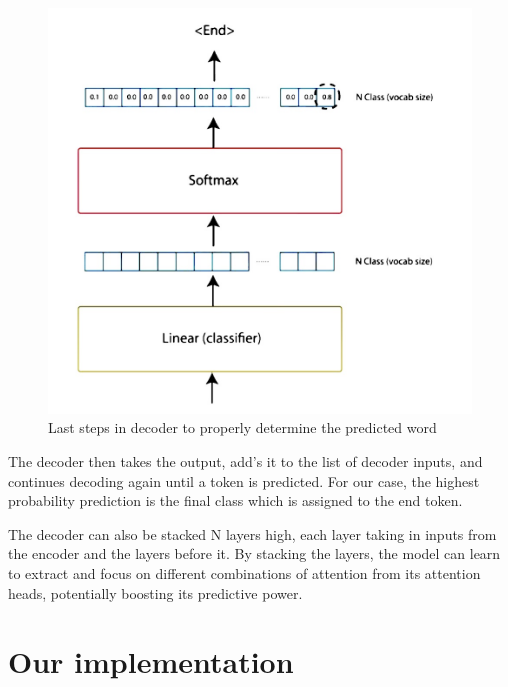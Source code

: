 \begin{figure}[H]
\centering
\includegraphics[width=.55\textwidth]{figures/t15.jpg}
\caption{Last steps in decoder to properly determine the predicted word}
\end{figure}


The decoder then takes the output, add’s it to the list of decoder inputs, and continues decoding again until a token is predicted. For our case, the highest probability prediction is the final class which is assigned to the end token.

The decoder can also be stacked N layers high, each layer taking in inputs from the encoder and the layers before it. By stacking the layers, the model can learn to extract and focus on different combinations of attention from its attention heads, potentially boosting its predictive power.
\newpage

\section{Our implementation}




